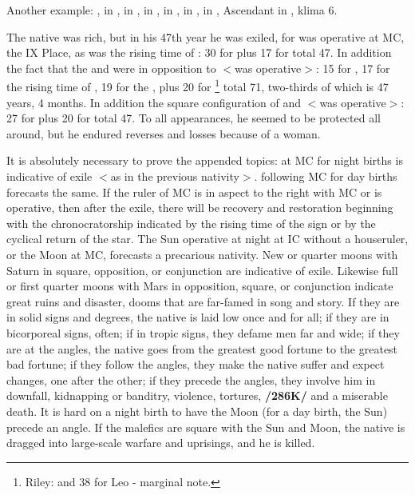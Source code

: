 Another example: \Sun, \Mercury\xspace in \Libra, \Moon\xspace in \Aquarius, \Saturn\xspace in \Pisces, \Jupiter\xspace in \Capricorn,
\Mars\xspace in \Aries, \Venus\xspace in \Leo, Ascendant in \Cancer, klima 6. 

The native was rich, but in his 47th year he was exiled, for \Saturn\xspace was operative at MC, the IX Place, as was the rising time of \Pisces: 30 for \Saturn\xspace plus 17 for \Pisces\xspace total 47. In addition the fact that the \Sun\xspace and \Mercury\xspace were in opposition to \Mars\xspace $<$was operative$>$: 15 for \Mars, 17 for the rising time of \Aries, 19 for the \Sun, plus 20 for \Mercury\xspace\footnote{Riley: and 38 for Leo - marginal note.} total 71, two-thirds of which is 47 years, 4 months. In addition the square configuration of \Libra\xspace and \Capricorn\xspace $<$was operative$>$: 27 for \Capricorn\xspace plus 20 for \Libra\xspace total 47. To all appearances, he seemed to be protected all around, but he endured reverses and losses because of a woman.

It is absolutely necessary to prove the appended topics: \Saturn\xspace at MC for night births is indicative of exile $<$as in the previous nativity$>$. \Mars\xspace following MC for day births forecasts the same. If the ruler of MC is in aspect to the right with MC or is operative, then after the exile, there will be recovery and
restoration beginning with the chronocratorship indicated by the rising time of the sign or by the cyclical return of the star. The Sun operative at night at IC without a houseruler, or the Moon at MC, forecasts a
precarious nativity. New or quarter moons with Saturn in square, opposition, or conjunction are indicative of exile. Likewise full or first quarter moons with Mars in opposition, square, or conjunction indicate great ruins and disaster, dooms that are far-famed in song and story. If they are in solid signs and degrees, the native is laid low once and for all; if they are in bicorporeal signs, often; if in tropic signs, they defame men far and wide; if they are at the angles, the native goes from the greatest good fortune to the greatest bad fortune; if they follow the angles, they make the native suffer and expect changes, one after the other; if they precede the angles, they involve him in downfall, kidnapping or banditry, violence, tortures, \textbf{/286K/} and a miserable death. It is hard on a night birth to have the Moon (for a day birth, the Sun) precede an angle. If the malefics are square with the Sun and Moon, the native is dragged into large-scale warfare and uprisings, and he is killed.

